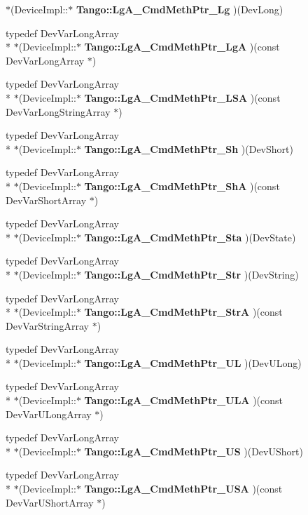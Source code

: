\begin{DoxyCompactItemize}
$\ast$(Device\-Impl\-::$\ast$ {\bf Tango\-::\-Lg\-A\-\_\-\-Cmd\-Meth\-Ptr\-\_\-\-Lg} )(Dev\-Long)
\item 
typedef Dev\-Var\-Long\-Array \\*
$\ast$(Device\-Impl\-::$\ast$ {\bf Tango\-::\-Lg\-A\-\_\-\-Cmd\-Meth\-Ptr\-\_\-\-Lg\-A} )(const Dev\-Var\-Long\-Array $\ast$)
\item 
typedef Dev\-Var\-Long\-Array \\*
$\ast$(Device\-Impl\-::$\ast$ {\bf Tango\-::\-Lg\-A\-\_\-\-Cmd\-Meth\-Ptr\-\_\-\-L\-S\-A} )(const Dev\-Var\-Long\-String\-Array $\ast$)
\item 
typedef Dev\-Var\-Long\-Array \\*
$\ast$(Device\-Impl\-::$\ast$ {\bf Tango\-::\-Lg\-A\-\_\-\-Cmd\-Meth\-Ptr\-\_\-\-Sh} )(Dev\-Short)
\item 
typedef Dev\-Var\-Long\-Array \\*
$\ast$(Device\-Impl\-::$\ast$ {\bf Tango\-::\-Lg\-A\-\_\-\-Cmd\-Meth\-Ptr\-\_\-\-Sh\-A} )(const Dev\-Var\-Short\-Array $\ast$)
\item 
typedef Dev\-Var\-Long\-Array \\*
$\ast$(Device\-Impl\-::$\ast$ {\bf Tango\-::\-Lg\-A\-\_\-\-Cmd\-Meth\-Ptr\-\_\-\-Sta} )(Dev\-State)
\item 
typedef Dev\-Var\-Long\-Array \\*
$\ast$(Device\-Impl\-::$\ast$ {\bf Tango\-::\-Lg\-A\-\_\-\-Cmd\-Meth\-Ptr\-\_\-\-Str} )(Dev\-String)
\item 
typedef Dev\-Var\-Long\-Array \\*
$\ast$(Device\-Impl\-::$\ast$ {\bf Tango\-::\-Lg\-A\-\_\-\-Cmd\-Meth\-Ptr\-\_\-\-Str\-A} )(const Dev\-Var\-String\-Array $\ast$)
\item 
typedef Dev\-Var\-Long\-Array \\*
$\ast$(Device\-Impl\-::$\ast$ {\bf Tango\-::\-Lg\-A\-\_\-\-Cmd\-Meth\-Ptr\-\_\-\-U\-L} )(Dev\-U\-Long)
\item 
typedef Dev\-Var\-Long\-Array \\*
$\ast$(Device\-Impl\-::$\ast$ {\bf Tango\-::\-Lg\-A\-\_\-\-Cmd\-Meth\-Ptr\-\_\-\-U\-L\-A} )(const Dev\-Var\-U\-Long\-Array $\ast$)
\item 
typedef Dev\-Var\-Long\-Array \\*
$\ast$(Device\-Impl\-::$\ast$ {\bf Tango\-::\-Lg\-A\-\_\-\-Cmd\-Meth\-Ptr\-\_\-\-U\-S} )(Dev\-U\-Short)
\item 
typedef Dev\-Var\-Long\-Array \\*
$\ast$(Device\-Impl\-::$\ast$ {\bf Tango\-::\-Lg\-A\-\_\-\-Cmd\-Meth\-Ptr\-\_\-\-U\-S\-A} )(const Dev\-Var\-U\-Short\-Array $\ast$)

\end{DoxyCompactItemize}
